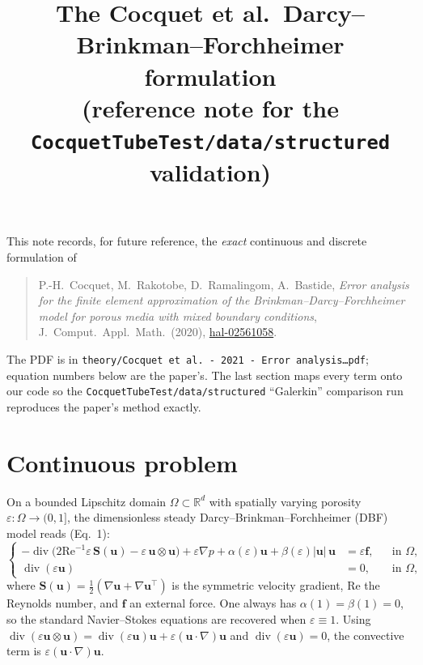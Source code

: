 \documentclass[11pt]{article}
\title{The Cocquet et al.\ Darcy--Brinkman--Forchheimer formulation\\[2pt]
\large (reference note for the \texttt{CocquetTubeTest/data/structured} validation)}
\author{}
\date{}
\newcommand{\uu}{\bm{u}}
\newcommand{\ff}{\bm{f}}
\newcommand{\grad}{\nabla}
\newcommand{\dive}{\operatorname{div}}
\newcommand{\Reyn}{\mathrm{Re}}
\newcommand{\Sten}{\bm{S}}
\begin{document}
\maketitle

\noindent
This note records, for future reference, the \emph{exact} continuous and discrete formulation of
\begin{quote}
P.-H.\ Cocquet, M.\ Rakotobe, D.\ Ramalingom, A.\ Bastide,
\emph{Error analysis for the finite element approximation of the Brinkman--Darcy--Forchheimer model
for porous media with mixed boundary conditions}, J.\ Comput.\ Appl.\ Math.\ (2020),
\href{https://hal.univ-reunion.fr/hal-02561058}{hal-02561058}.
\end{quote}
The PDF is in \texttt{theory/Cocquet et al.\ - 2021 - Error analysis\ldots pdf}; equation numbers below
are the paper's. The last section maps every term onto our code so the
\texttt{CocquetTubeTest/data/structured} ``Galerkin'' comparison run reproduces the paper's method exactly.

\section{Continuous problem}

On a bounded Lipschitz domain $\Omega\subset\mathbb{R}^d$ with spatially varying porosity
$\varepsilon:\Omega\to(0,1]$, the dimensionless steady Darcy--Brinkman--Forchheimer (DBF) model
reads (Eq.~1):
\begin{equation}
\left\{
\begin{aligned}
-\dive\!\big(2\Reyn^{-1}\varepsilon\,\Sten(\uu) - \varepsilon\,\uu\otimes\uu\big)
   + \varepsilon\grad p + \alpha(\varepsilon)\uu + \beta(\varepsilon)|\uu|\,\uu
   &= \varepsilon\ff, && \text{in }\Omega,\\
\dive(\varepsilon\uu) &= 0, && \text{in }\Omega,
\end{aligned}
\right.
\end{equation}
where $\Sten(\uu)=\tfrac12(\grad\uu+\grad\uu^{\top})$ is the symmetric velocity gradient, $\Reyn$ the
Reynolds number, and $\ff$ an external force. One always has $\alpha(1)=\beta(1)=0$, so the standard
Navier--Stokes equations are recovered when $\varepsilon\equiv1$. Using
$\dive(\varepsilon\uu\otimes\uu)=\dive(\varepsilon\uu)\uu+\varepsilon(\uu\cdot\grad)\uu$ and
$\dive(\varepsilon\uu)=0$, the convective term is $\varepsilon(\uu\cdot\grad)\uu$.
\end{document}
